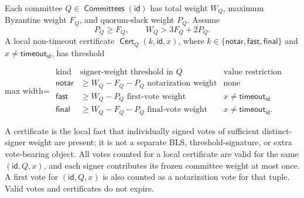 \documentclass[sigplan,twocolumn,review,anonymous]{acmart}
\newcommand{\func}[1]{\operatorname{\mathsf{#1}}}
\newcommand{\Cert}{\func{Cert}}
\newcommand{\id}{\mathsf{id}}
\newcommand{\timeoutVal}{\mathsf{timeout}}
\newcommand{\notarKind}{\mathsf{notar}}
\newcommand{\fastKind}{\mathsf{fast}}
\newcommand{\finalKind}{\mathsf{final}}
\newcommand{\Committees}{\func{Committees}}
\begin{document}
Each committee \(Q\in\Committees(\id)\) has total weight \(W_Q\), maximum Byzantine weight
\(F_Q\), and quorum-slack weight \(P_Q\).  Assume
\[
P_Q\ge F_Q,
\qquad
W_Q>3F_Q+2P_Q.
\]
A local non-timeout certificate \(\Cert_Q(k,\id,x)\), where
\(k\in\{\notarKind,\fastKind,\finalKind\}\) and \(x\neq\timeoutVal_\id\), has threshold
\begin{center}
\begin{adjustbox}{max width=\columnwidth}
\(\displaystyle
\begin{array}{c|c|c}
\text{kind} & \text{signer-weight threshold in }Q & \text{value restriction}\\
\hline
\notarKind & \ge W_Q-F_Q-P_Q \text{ notarization weight} & \text{none}\\
\fastKind & \ge W_Q-P_Q \text{ first-vote weight} & x\neq\timeoutVal_\id\\
\finalKind & \ge W_Q-F_Q-P_Q \text{ final-vote weight} & x\neq\timeoutVal_\id.
\end{array}
\)
\end{adjustbox}
\end{center}
A certificate is the local fact that individually signed votes of sufficient distinct-signer weight are
present; it is not a separate BLS, threshold-signature, or extra vote-bearing object.  All votes counted
for a local certificate are valid for the same \((\id,Q,x)\), and each signer contributes its frozen
committee weight at most once.  A first vote for \((\id,Q,x)\) is also counted as a notarization vote
for that tuple.  Valid votes and certificates do not expire.
\end{document}
